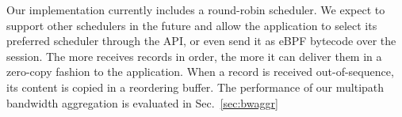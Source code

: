 Our implementation currently includes a round-robin scheduler. We expect to
support other schedulers in the future and allow the application to select its preferred scheduler through the API, or even send it as eBPF bytecode over the session. The more \tcpls receives records in order, the more it can deliver them in a zero-copy fashion to the application. When a record is received out-of-sequence, its content is copied in a reordering buffer. The performance of our multipath bandwidth aggregation is evaluated in Sec.~\ref{sec:bwaggr}





